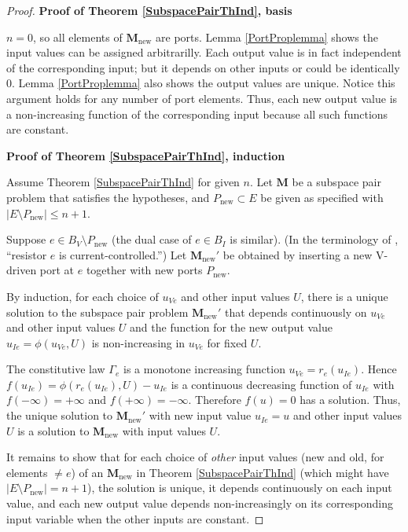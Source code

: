 \documentclass{amsproc-sunycstr}
\theoremstyle{plain}
\theoremstyle{definition}
\theoremstyle{remark}
\newcommand{\Pnew}{{P_{\mbox{new}}}}
\newcommand{\Mnew}{{\mathbf{M}_{\mbox{new}}}}
\begin{document}
\begin{proof}

\textbf{Proof of Theorem 
\ref{SubspacePairThInd}, basis}

$n = 0$, so all elements of $\Mnew$ are ports.
Lemma \ref{PortProplemma} shows the input values can be assigned 
arbitrarilly.  Each output
value is in fact independent of the corresponding input; but it depends on 
other inputs or could be identically $0$.  
Lemma \ref{PortProplemma}
also shows the output values are unique.
Notice this argument holds for
any number of port elements.  Thus, each new output value is a non-increasing
function of the corresponding input because all such functions are constant.

\textbf{Proof of Theorem 
\ref{SubspacePairThInd}, induction}

Assume Theorem \ref{SubspacePairThInd}
for given $n$.  Let $\textbf{M}$ be a subspace pair
problem that satisfies the hypotheses, and $\Pnew\subset E$ be given
as specified with $|E\setminus\Pnew|\leq n+1$.

Suppose $e\in B_V\setminus\Pnew$ 
(the dual case of $e\in B_I$ is similar).  
(In the terminology of \cite{HaslerNeirynck,Fosseprez}, ``resistor 
$e$ is current-controlled.'')  
Let $\Mnew'$ be obtained by inserting a new V-driven port at 
$e$ together with new ports $\Pnew$.  

By induction, for each choice of 
$u_{\mathit{Ve}}$ and other input values $U$, there is a unique solution
to the subspace pair problem $\Mnew'$
that depends continuously on $u_{\mathit{Ve}}$ and other input values $U$
and the function
for the new output value 
$u_{\mathit{Ie}}=\phi(u_{\mathit{Ve}},U)$ 
is non-increasing in $u_{\mathit{Ve}}$ for fixed $U$.  

The constitutive law $\Gamma_e$ is a monotone increasing function
$u_{\mathit{Ve}}=r_e(u_{\mathit{Ie}})$.  Hence 
$f(u_{\mathit{Ie}})=\phi(r_e(u_{\mathit{Ie}}),U) - u_{\mathit{Ie}}$ is a
continuous decreasing function of $u_{\mathit{Ie}}$ with $f(-\infty)=+\infty$
and $f(+\infty)=-\infty$.  Therefore $f(u)=0$ has a solution.
Thus, the unique solution to $\Mnew'$ with new input value $u_{\mathit{Ie}}=u$
and other input values $U$ is a solution to $\Mnew$ with input values $U$.

It remains to show that for each choice of 
\textit{other} 
input values (new and old, for elements $\neq e$)
of an $\Mnew$ in Theorem \ref{SubspacePairThInd}
(which might have $|E\setminus \Pnew|=n+1$), the solution
is unique, it depends continuously on each input value, and each new output
value depends non-increasingly on its corresponding input variable when the 
other inputs are constant.


\end{proof}
\end{document}
